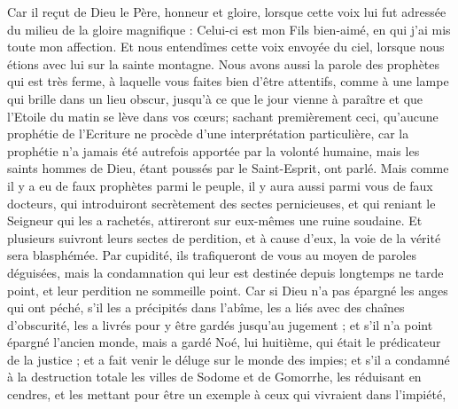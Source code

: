 \begin{multicols}{2}
Car il reçut de Dieu le Père, honneur et gloire, lorsque cette voix lui fut adressée du milieu de la gloire magnifique : Celui-ci est mon Fils bien-aimé, en qui j'ai mis toute mon affection.
Et nous entendîmes cette voix envoyée du ciel, lorsque nous étions avec lui sur la sainte montagne.
Nous avons aussi la parole des prophètes qui est très ferme, à laquelle vous faites bien d'être attentifs, comme à une lampe qui brille dans un lieu obscur, jusqu'à ce que le jour vienne à paraître et que l'Etoile du matin se lève dans vos cœurs;
sachant premièrement ceci, qu'aucune prophétie de l'Ecriture ne procède d'une interprétation particulière,
car la prophétie n'a jamais été autrefois apportée par la volonté humaine, mais les saints hommes de Dieu, étant poussés par le Saint-Esprit, ont parlé.
\VerseOne{}Mais comme il y a eu de faux prophètes parmi le peuple, il y aura aussi parmi vous de faux docteurs, qui introduiront secrètement des sectes pernicieuses, et qui reniant le Seigneur qui les a rachetés, attireront sur eux-mêmes une ruine soudaine. 
Et plusieurs suivront leurs sectes de perdition, et à cause d'eux, la voie de la vérité sera blasphémée.
Par cupidité, ils trafiqueront de vous au moyen de paroles déguisées, mais la condamnation qui leur est destinée depuis longtemps ne tarde point, et leur perdition ne sommeille point.
Car si Dieu n'a pas épargné les anges qui ont péché, s'il les a précipités dans l'abîme, les a liés avec des chaînes d'obscurité, les a livrés pour y être gardés jusqu'au jugement ;
et s'il n'a point épargné l'ancien monde, mais a gardé Noé, lui huitième, qui était le prédicateur de la justice ; et a fait venir le déluge sur le monde des impies;
et s'il a condamné à la destruction totale les villes de Sodome et de Gomorrhe, les réduisant en cendres, et les mettant pour être un exemple à ceux qui vivraient dans l'impiété,

\end{multicols}
